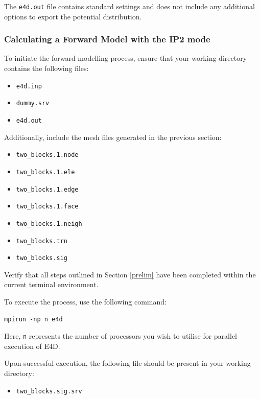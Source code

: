 \documentclass[a4paper,12pt]{article}
\begin{document}
The \texttt{e4d.out} file contains standard settings and does not include any additional options to export the potential distribution.

\subsubsection{Calculating a Forward Model with the IP2 mode}

To initiate the forward modelling process, ensure that your working directory contains the following files:

\begin{itemize}
    \item \texttt{e4d.inp}
    \item \texttt{dummy.srv}
    \item \texttt{e4d.out}
\end{itemize}

Additionally, include the mesh files generated in the previous section:

\begin{itemize}
    \item \texttt{two\_blocks.1.node}
    \item \texttt{two\_blocks.1.ele}
    \item \texttt{two\_blocks.1.edge}
    \item \texttt{two\_blocks.1.face}
    \item \texttt{two\_blocks.1.neigh}
    \item \texttt{two\_blocks.trn}
    \item \texttt{two\_blocks.sig}
\end{itemize}


Verify that all steps outlined in Section \ref{prelim} have been completed within the current terminal environment.

To execute the process, use the following command:

\begin{verbatim}
mpirun -np n e4d
\end{verbatim}

Here, \texttt{n} represents the number of processors you wish to utilise for parallel execution of E4D.

Upon successful execution, the following file should be present in your working directory:

\begin{itemize}
    \item \texttt{two\_blocks.sig.srv}
\end{itemize}
\end{document}
